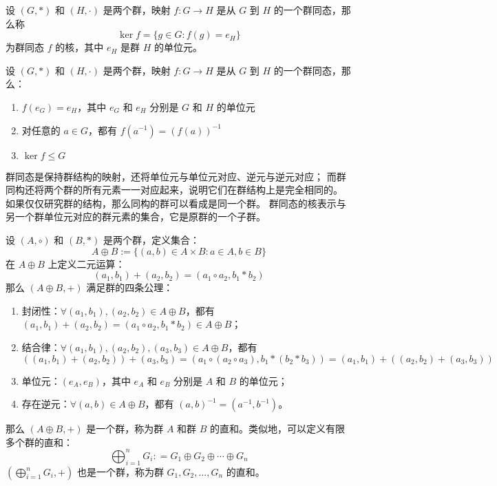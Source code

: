 \begin{definition}
    设 $(G, *)$ 和 $(H, \cdot)$ 是两个群，映射 $f: G \to H$ 是从 $G$ 到 $H$ 的一个群同态，那么称
    \[
        \ker f = \{g\in G : f(g) = e_H\}
    \]
    为群同态 $f$ 的核，其中 $e_H$ 是群 $H$ 的单位元。
\end{definition}

\begin{proposition}[群同态的性质]
    设 $(G, *)$ 和 $(H, \cdot)$ 是两个群，映射 $f: G \to H$ 是从 $G$ 到 $H$ 的一个群同态，那么：
    \begin{enumerate}
        \item $f(e_G) = e_H$，其中 $e_G$ 和 $e_H$ 分别是 $G$ 和 $H$ 的单位元
        \item 对任意的 $a\in G$，都有 $f(a^{-1}) = (f(a))^{-1}$
        \item $\ker f \le G$
    \end{enumerate}
\end{proposition}

\begin{note}
    群同态是保持群结构的映射，还将单位元与单位元对应、逆元与逆元对应；
    而群同构还将两个群的所有元素一一对应起来，说明它们在群结构上是完全相同的。
    如果仅仅研究群的结构，那么同构的群可以看成是同一个群。
    群同态的核表示与另一个群单位元对应的群元素的集合，它是原群的一个子群。
\end{note}
\vspace{1em}

\begin{definition}
    设 $(A,\circ)$ 和 $(B,*)$ 是两个群，定义集合：
    \[
        A \oplus B := \{(a,b)\in A\times B:a\in A, b\in B\}
    \]
    在 $A \oplus B$ 上定义二元运算：
    \[
        (a_1,b_1) + (a_2,b_2) = (a_1 \circ a_2, b_1 * b_2)
    \]
    那么 $(A \oplus B, +)$ 满足群的四条公理：
    \begin{enumerate}
        \item 封闭性：$\forall (a_1,b_1), (a_2,b_2)\in A \oplus B$，都有 $(a_1,b_1) + (a_2,b_2) = (a_1 \circ a_2, b_1 * b_2) \in A \oplus B$；
        \item 结合律：$\forall (a_1,b_1), (a_2,b_2), (a_3,b_3)\in A \oplus B$，都有 
        \[
            ((a_1,b_1)  + (a_2,b_2)) + (a_3,b_3) = (a_1 \circ (a_2 \circ a_3), b_1 * (b_2 * b_3)) = (a_1,b_1) + ((a_2,b_2) + (a_3,b_3))
        \]
        \item 单位元：$(e_A, e_B)$，其中 $e_A$ 和 $e_B$ 分别是 $A$ 和 $B$ 的单位元；
        \item 存在逆元：$\forall (a,b)\in A \oplus B$，都有 $(a,b)^{-1} = (a^{-1}, b^{-1})$。
    \end{enumerate}
    那么 $(A \oplus B, +)$ 是一个群，称为群 $A$ 和群 $B$ 的直和。类似地，可以定义有限多个群的直和：
    \[
        \bigoplus^n_{i=1}G_i : = G_1\oplus G_2\oplus\cdots \oplus G_n
    \]
    $(\bigoplus^n_{i=1}G_i, +)$ 也是一个群，称为群 $G_1, G_2, \ldots, G_n$ 的直和。
    \label{def:group_direct_sum}
\end{definition}

